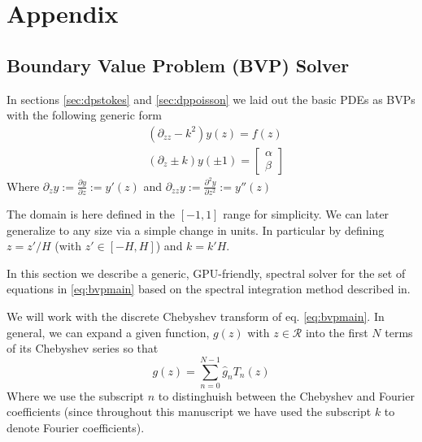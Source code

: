 \documentclass[ twoside,openright,titlepage,numbers=noenddot,%
headinclude,footinclude,cleardoublepage=empty,abstract=on,
BCOR=5mm,paper=a4,fontsize=11pt, dvipsnames
]{scrreprt}
\newcommand{\gpu}{\gls{GPU}\xspace}
\newcommand{\fou}[1]{\widehat{#1}}
\begin{document}
\newpage


\appendix
\part{Appendix}

\chapter{Boundary Value Problem (BVP) Solver} \label{sec:bvp}
In sections \ref{sec:dpstokes} and \ref{sec:dppoisson} we laid out the basic \glspl{PDE} as \glspl{BVP} with the following generic form
\begin{equation}
  \label{eq:bvpmain}
  \begin{aligned}
    &(\partial_{zz}-k^2)y(z)=f(z)\\
    &(\partial_{z}\pm k)y(\pm 1)=
    \begin{bmatrix}
      \alpha\\
      \beta
    \end{bmatrix}
\end{aligned}
\end{equation}
Where $\partial_z y:= \frac{\partial y}{\partial z} := y'(z)$ and $\partial_{zz} y:= \frac{\partial^2 y}{\partial z^2} := y''(z)$

The domain is here defined in the $[-1, 1]$ range for simplicity. We can later generalize to any size via a simple change in units. In particular by defining $z = z'/H$ (with $z'\in [-H, H]$) and $k = k'H$.

In this section we describe a generic, \gpu-friendly, spectral solver for the set of equations in \eqref{eq:bvpmain} based on the spectral integration method described in\cite{Greengard1991}.


We will work with the discrete Chebyshev transform of eq. \eqref{eq:bvpmain}. In general, we can expand a given function, $g(z)$ with $z\in \mathcal{R}$ into the first $N$ terms of its Chebyshev series so that
\begin{equation}
\label{eq:bvpchebexp}
g(z) = \sum_{n=0}^{N-1} \fou{g}_n T_n(z)
\end{equation}
Where we use the subscript $n$ to distinghuish between the Chebyshev and Fourier coefficients (since throughout this manuscript we have used the subscript $k$ to denote Fourier coefficients).
\end{document}
